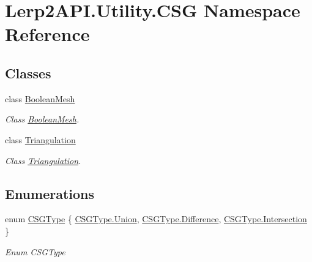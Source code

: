 \hypertarget{namespace_lerp2_a_p_i_1_1_utility_1_1_c_s_g}{}\section{Lerp2\+A\+P\+I.\+Utility.\+C\+SG Namespace Reference}
\label{namespace_lerp2_a_p_i_1_1_utility_1_1_c_s_g}
\subsection*{Classes}
\begin{DoxyCompactItemize}
\item 
class \hyperlink{class_lerp2_a_p_i_1_1_utility_1_1_c_s_g_1_1_boolean_mesh}{Boolean\+Mesh}
\begin{DoxyCompactList}\small\item\em Class \hyperlink{class_lerp2_a_p_i_1_1_utility_1_1_c_s_g_1_1_boolean_mesh}{Boolean\+Mesh}. \end{DoxyCompactList}\item 
class \hyperlink{class_lerp2_a_p_i_1_1_utility_1_1_c_s_g_1_1_triangulation}{Triangulation}
\begin{DoxyCompactList}\small\item\em Class \hyperlink{class_lerp2_a_p_i_1_1_utility_1_1_c_s_g_1_1_triangulation}{Triangulation}. \end{DoxyCompactList}\end{DoxyCompactItemize}
\subsection*{Enumerations}
\begin{DoxyCompactItemize}
\item 
enum \hyperlink{namespace_lerp2_a_p_i_1_1_utility_1_1_c_s_g_a2deac4fec3ded614ea4aa42e1a7155db}{C\+S\+G\+Type} \{ \hyperlink{namespace_lerp2_a_p_i_1_1_utility_1_1_c_s_g_a2deac4fec3ded614ea4aa42e1a7155dbaaef12e903e606a4895a16b393bfdec8c}{C\+S\+G\+Type.\+Union}, 
\hyperlink{namespace_lerp2_a_p_i_1_1_utility_1_1_c_s_g_a2deac4fec3ded614ea4aa42e1a7155dba28ed2ac6c29f64a3692c956004b8ff7a}{C\+S\+G\+Type.\+Difference}, 
\hyperlink{namespace_lerp2_a_p_i_1_1_utility_1_1_c_s_g_a2deac4fec3ded614ea4aa42e1a7155dbaa06d31c2ee920b4d53e8c9c06d90ba24}{C\+S\+G\+Type.\+Intersection}
 \}\begin{DoxyCompactList}\small\item\em Enum C\+S\+G\+Type \end{DoxyCompactList}
\end{DoxyCompactItemize}


